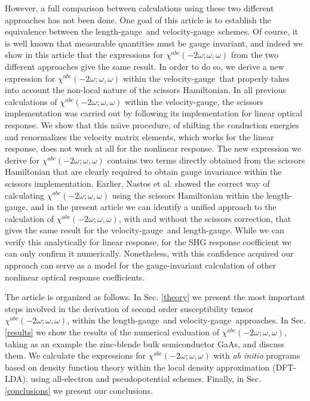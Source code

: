 \documentclass[floatfix,prb,aps,superscriptaddress,11pt]{revtex4}
\begin{document}
However, a full comparison between calculations using these two different
approaches has not been done. One goal of this article is to establish the
equivalence between the length-gauge~and velocity-gauge~schemes. Of course, it is well known
that measurable quantities must be gauge invariant, and indeed we show in
this article that the expressions for $\chi^{abc}(-2\omega;\omega,\omega)$ from the two different
approaches give the same result. In order to do so, we derive a new
expression for $\chi^{abc}(-2\omega;\omega,\omega)$ within the velocity-gauge~that properly takes into
account the non-local nature of the scissors Hamiltonian. In all previous
calculations of $\chi^{abc}(-2\omega;\omega,\omega)$ within the velocity-gauge, the scissors implementation
was carried out by following its implementation for linear optical response.
We show that this na\"{\i}ve procedure,
of shifting the conduction energies and renormalizes the velocity matrix
elements, which works for the linear response, does
not work at all for the nonlinear response. The new expression we derive for 
$\chi^{abc}(-2\omega;\omega,\omega)$ contains two terms directly obtained from the scissors
Hamiltonian that are clearly required to obtain gauge invariance within the
scissors implementation. Earlier, Nastos et al.\cite{nastosPRB05} showed the
correct way of calculating $\chi^{abc}(-2\omega;\omega,\omega)$ using the scissors Hamiltonian
within the length-gauge, and in the present article we can identify a unified
approach to the calculation of $\chi^{abc}(-2\omega;\omega,\omega)$, 
with and without the scissors
correction, that gives the same result for the velocity-gauge~and length-gauge. While we
can verify this analytically for linear response,\cite{aversaPRB95}
 for the SHG response
coefficient we can only confirm it numerically. Nonetheless, with this
confidence acquired our approach can serve as a model for the
gauge-invariant calculation of other nonlinear optical response coefficients.

The article is organized as follows. In Sec. \ref{theory} we present the
most important steps involved in the derivation of second order
susceptibility tensor $\chi^{abc}(-2\omega;\omega,\omega)$, within the length-gauge~and velocity-gauge~approaches.
In Sec. \ref{results} we show the results of the numerical evaluation
of $\chi^{abc}(-2\omega;\omega,\omega)$, taking as an example the zinc-blende bulk semiconductor
GaAs, and discuss them. 
We calculate the expressions for $\chi^{abc}(-2\omega;\omega,\omega)$ with 
{\it ab initio} programs 
based on density function theory within the local density
approximation 
(DFT-LDA), using all-electron and pseudopotential schemes.
Finally, in Sec. \ref{conclusions} we present our conclusions.
\end{document}
